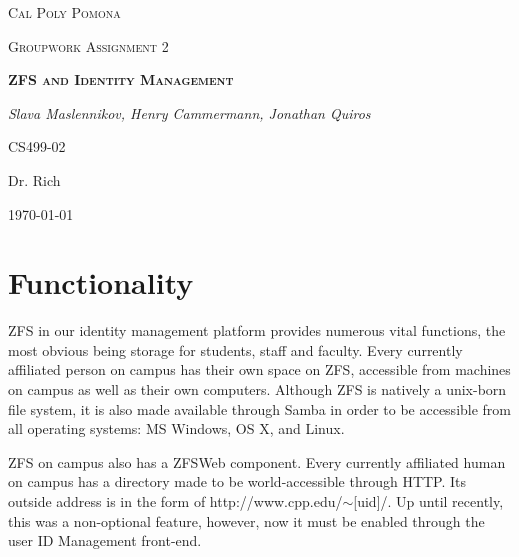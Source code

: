\documentclass[letterpaper,12pt,titlepage]{article}
\date{Monday, March 7th 2016}
\author{Slava Maslennikov \and Henry Ammermann \and Jonathan Quiros}
\begin{document}

\begin{titlepage}
\centering
{\scshape\LARGE Cal Poly Pomona\par}
\vspace{1cm}
{\scshape\Large Groupwork Assignment 2\par}
\vspace{1.5cm}
{\scshape\bfseries ZFS and Identity Management\par}
\vspace{2cm}
{\Large\itshape Slava Maslennikov, Henry Cammermann, Jonathan Quiros\par}
\vfill
CS499-02\par
Dr. Rich
\vfill
{\large \today\par}
\end{titlepage}

\tableofcontents

%

\section{Functionality}
ZFS in our identity management platform provides numerous vital functions, the most obvious being storage for students, staff and faculty. Every currently affiliated person on campus has their own space on ZFS, accessible from machines on campus as well as their own computers. Although ZFS is natively a unix-born file system, it is also made available through Samba in order to be accessible from all operating systems: MS Windows, OS X, and Linux. 

ZFS on campus also has a ZFSWeb component. Every currently affiliated human on campus has a directory made to be world-accessible through HTTP. Its outside address is in the form of http://www.cpp.edu/$\sim$[uid]/. Up until recently, this was a non-optional feature, however, now it must be enabled through the user ID Management front-end.

\end{document}
